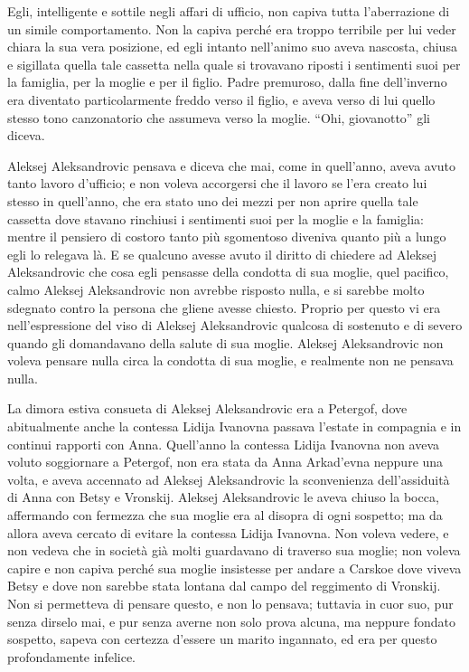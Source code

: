 Egli, intelligente e sottile negli affari di ufficio, non capiva tutta l'aberrazione di un simile comportamento. Non la capiva perché era troppo terribile per lui veder chiara la sua vera posizione, ed egli intanto nell'animo suo aveva nascosta, chiusa e sigillata quella tale cassetta nella quale si trovavano riposti i sentimenti suoi per la famiglia, per la moglie e per il figlio. Padre premuroso, dalla fine dell'inverno era diventato particolarmente freddo verso il figlio, e aveva verso di lui quello stesso tono canzonatorio che assumeva verso la moglie. ``Ohi, giovanotto'' gli diceva. 

Aleksej Aleksandrovic pensava e diceva che mai, come in quell'anno, aveva avuto tanto lavoro d'ufficio; e non voleva accorgersi che il lavoro se l'era creato lui stesso in quell'anno, che era stato uno dei mezzi per non aprire quella tale cassetta dove stavano rinchiusi i sentimenti suoi per la moglie e la famiglia: mentre il pensiero di costoro tanto più sgomentoso diveniva quanto più a lungo egli lo relegava là. E se qualcuno avesse avuto il diritto di chiedere ad Aleksej Aleksandrovic che cosa egli pensasse della condotta di sua moglie, quel pacifico, calmo Aleksej Aleksandrovic non avrebbe risposto nulla, e si sarebbe molto sdegnato contro la persona che gliene avesse chiesto. Proprio per questo vi era nell'espressione del viso di Aleksej Aleksandrovic qualcosa di sostenuto e di severo quando gli domandavano della salute di sua moglie. Aleksej Aleksandrovic non voleva pensare nulla circa la condotta di sua moglie, e realmente non ne pensava nulla. 

La dimora estiva consueta di Aleksej Aleksandrovic era a Petergof, dove abitualmente anche la contessa Lidija Ivanovna passava l'estate in compagnia e in continui rapporti con Anna. Quell'anno la contessa Lidija Ivanovna non aveva voluto soggiornare a Petergof, non era stata da Anna Arkad'evna neppure una volta, e aveva accennato ad Aleksej Aleksandrovic la sconvenienza dell'assiduità di Anna con Betsy e Vronskij. Aleksej Aleksandrovic le aveva chiuso la bocca, affermando con fermezza che sua moglie era al disopra di ogni sospetto; ma da allora aveva cercato di evitare la contessa Lidija Ivanovna. Non voleva vedere, e non vedeva che in società già molti guardavano di traverso sua moglie; non voleva capire e non capiva perché sua moglie insistesse per andare a Carskoe dove viveva Betsy e dove non sarebbe stata lontana dal campo del reggimento di Vronskij. Non si permetteva di pensare questo, e non lo pensava; tuttavia in cuor suo, pur senza dirselo mai, e pur senza averne non solo prova alcuna, ma neppure fondato sospetto, sapeva con certezza d'essere un marito ingannato, ed era per questo profondamente infelice. 

